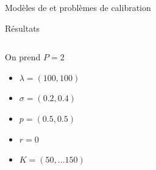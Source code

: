 \documentclass[final]{beamer}
\newlength{\onecolwid}
\newlength{\twocolwid}
\begin{document}
\begin{frame}[t]
\begin{columns}[t]
\begin{column}{\twocolwid}
\begin{block}{Modèles de  et problèmes de calibration}
\end{block}


\vspace{-1cm}
\begin{block}{Résultats}


\begin{columns}[t,totalwidth=0.45\paperwidth] %

\begin{column}{\onecolwid} %


\begin{minipage}{0.49\textwidth}
  \vspace{1cm}
  On prend $P = 2$
  \begin{itemize}
    \item $\lambda = (100,100)$
    \item $\sigma = (0.2, 0.4)$
    \item $p = (0.5,0.5) $
    \item $r = 0$
    \item $K = (50,...150)$
  \end{itemize}
\end{minipage}


\end{column}
\end{columns}
\end{block}
\end{column}
\end{columns}
\end{frame}
\end{document}
